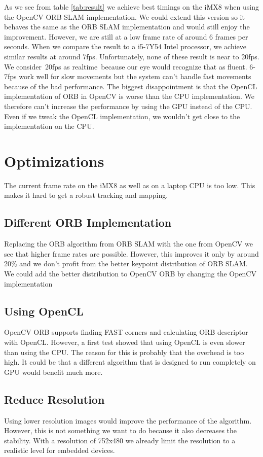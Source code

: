 \documentclass[11pt,a4paper,titlepage,oneside]{report}
\begin{document}
As we see from table \ref{tab:result} we achieve best timings on the iMX8 when using the OpenCV ORB SLAM implementation. We could extend this version so it behaves the same as the ORB SLAM implementation and would still enjoy the improvement. However, we are still at a low frame rate of around 6 frames per seconds. When we compare the result to a i5-7Y54 Intel processor, we achieve similar results at around 7fps. Unfortunately, none of these result is near to 20fps. We consider 20fps as realtime because our eye would recognize that as fluent. 6-7fps work well for slow movements but the system can’t handle fast movements because of the bad performance. The biggest disappointment is that the OpenCL implementation of ORB in OpenCV is worse than the CPU implementation. We therefore can’t increase the performance by using the GPU instead of the CPU. Even if we tweak the OpenCL implementation, we wouldn’t get close to the implementation on the CPU.

\section{Optimizations}

The current frame rate on the iMX8 as well as on a laptop CPU is too low. This makes it hard to get a robust tracking and mapping.

\subsection{Different ORB Implementation}
Replacing the ORB algorithm from ORB SLAM with the one from OpenCV we see that higher frame rates are possible. However, this improves it only by around 20\% and we don’t profit from the better keypoint distribution of ORB SLAM. We could add the better distribution to OpenCV ORB by changing the OpenCV implementation

\subsection{Using OpenCL}
OpenCV ORB supports finding FAST corners and calculating ORB descriptor with OpenCL. However, a first test showed that using OpenCL is even slower than using the CPU. The reason for this is probably that the overhead is too high. It could be that a different algorithm that is designed to run completely on GPU would benefit much more.

\subsection{Reduce Resolution}
Using lower resolution images would improve the performance of the algorithm. However, this is not something we want to do because it also decreases the stability. With a resolution of 752x480 we already limit the resolution to a realistic level for embedded devices.
\end{document}
